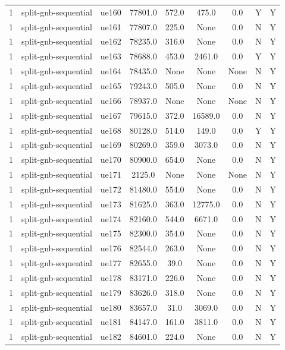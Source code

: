 \begin{table}[ht]
\begin{tabular}{|c|c|c|c|c|c|c|c|c|}
1 & split-gnb-sequential & ue160 & 77801.0 & 572.0 & 475.0 & 0.0 & Y & Y \\
1 & split-gnb-sequential & ue161 & 77807.0 & 225.0 & None & 0.0 & N & Y \\
1 & split-gnb-sequential & ue162 & 78235.0 & 316.0 & None & 0.0 & N & Y \\
1 & split-gnb-sequential & ue163 & 78688.0 & 453.0 & 2461.0 & 0.0 & Y & Y \\
1 & split-gnb-sequential & ue164 & 78435.0 & None & None & None & N & Y \\
1 & split-gnb-sequential & ue165 & 79243.0 & 505.0 & None & 0.0 & N & Y \\
1 & split-gnb-sequential & ue166 & 78937.0 & None & None & None & N & Y \\
1 & split-gnb-sequential & ue167 & 79615.0 & 372.0 & 16589.0 & 0.0 & N & Y \\
1 & split-gnb-sequential & ue168 & 80128.0 & 514.0 & 149.0 & 0.0 & Y & Y \\
1 & split-gnb-sequential & ue169 & 80269.0 & 359.0 & 3073.0 & 0.0 & N & Y \\
1 & split-gnb-sequential & ue170 & 80900.0 & 654.0 & None & 0.0 & N & Y \\
1 & split-gnb-sequential & ue171 & 2125.0 & None & None & None & N & Y \\
1 & split-gnb-sequential & ue172 & 81480.0 & 554.0 & None & 0.0 & N & Y \\
1 & split-gnb-sequential & ue173 & 81625.0 & 363.0 & 12775.0 & 0.0 & N & Y \\
1 & split-gnb-sequential & ue174 & 82160.0 & 544.0 & 6671.0 & 0.0 & N & Y \\
1 & split-gnb-sequential & ue175 & 82300.0 & 354.0 & None & 0.0 & N & Y \\
1 & split-gnb-sequential & ue176 & 82544.0 & 263.0 & None & 0.0 & N & Y \\
1 & split-gnb-sequential & ue177 & 82655.0 & 39.0 & None & 0.0 & N & Y \\
1 & split-gnb-sequential & ue178 & 83171.0 & 226.0 & None & 0.0 & N & Y \\
1 & split-gnb-sequential & ue179 & 83626.0 & 318.0 & None & 0.0 & N & Y \\
1 & split-gnb-sequential & ue180 & 83657.0 & 31.0 & 3069.0 & 0.0 & N & Y \\
1 & split-gnb-sequential & ue181 & 84147.0 & 161.0 & 3811.0 & 0.0 & N & Y \\
1 & split-gnb-sequential & ue182 & 84601.0 & 224.0 & None & 0.0 & N & Y \\

\end{tabular}
\end{table}
